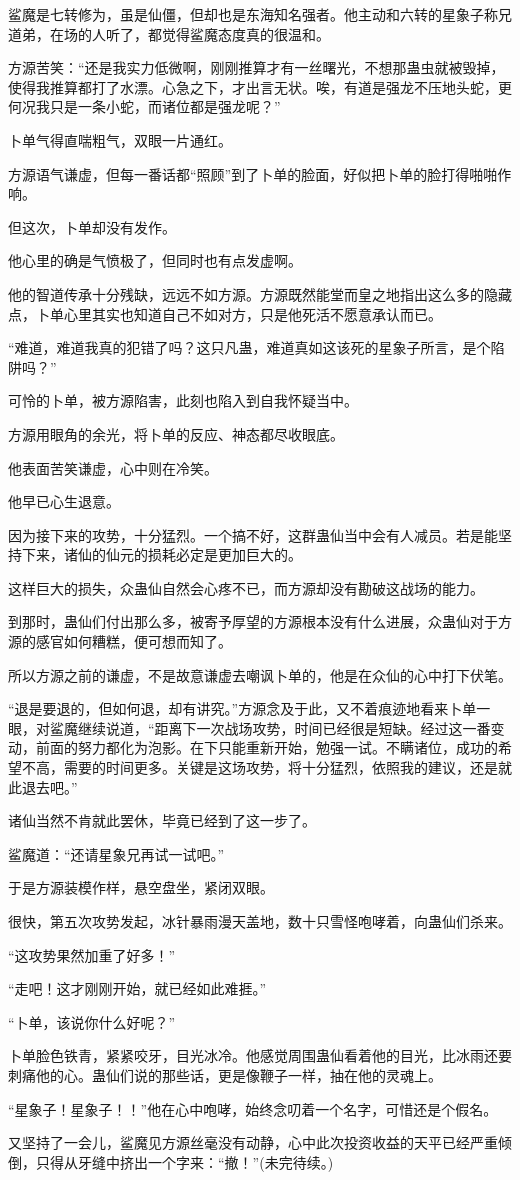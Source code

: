 \begin{this_body}
鲨魔是七转修为，虽是仙僵，但却也是东海知名强者。他主动和六转的星象子称兄道弟，在场的人听了，都觉得鲨魔态度真的很温和。

方源苦笑：“还是我实力低微啊，刚刚推算才有一丝曙光，不想那蛊虫就被毁掉，使得我推算都打了水漂。心急之下，才出言无状。唉，有道是强龙不压地头蛇，更何况我只是一条小蛇，而诸位都是强龙呢？”

卜单气得直喘粗气，双眼一片通红。

方源语气谦虚，但每一番话都“照顾”到了卜单的脸面，好似把卜单的脸打得啪啪作响。

但这次，卜单却没有发作。

他心里的确是气愤极了，但同时也有点发虚啊。

他的智道传承十分残缺，远远不如方源。方源既然能堂而皇之地指出这么多的隐藏点，卜单心里其实也知道自己不如对方，只是他死活不愿意承认而已。

“难道，难道我真的犯错了吗？这只凡蛊，难道真如这该死的星象子所言，是个陷阱吗？”

可怜的卜单，被方源陷害，此刻也陷入到自我怀疑当中。

方源用眼角的余光，将卜单的反应、神态都尽收眼底。

他表面苦笑谦虚，心中则在冷笑。

他早已心生退意。

因为接下来的攻势，十分猛烈。一个搞不好，这群蛊仙当中会有人减员。若是能坚持下来，诸仙的仙元的损耗必定是更加巨大的。

这样巨大的损失，众蛊仙自然会心疼不已，而方源却没有勘破这战场的能力。

到那时，蛊仙们付出那么多，被寄予厚望的方源根本没有什么进展，众蛊仙对于方源的感官如何糟糕，便可想而知了。

所以方源之前的谦虚，不是故意谦虚去嘲讽卜单的，他是在众仙的心中打下伏笔。

“退是要退的，但如何退，却有讲究。”方源念及于此，又不着痕迹地看来卜单一眼，对鲨魔继续说道，“距离下一次战场攻势，时间已经很是短缺。经过这一番变动，前面的努力都化为泡影。在下只能重新开始，勉强一试。不瞒诸位，成功的希望不高，需要的时间更多。关键是这场攻势，将十分猛烈，依照我的建议，还是就此退去吧。”

诸仙当然不肯就此罢休，毕竟已经到了这一步了。

鲨魔道：“还请星象兄再试一试吧。”

于是方源装模作样，悬空盘坐，紧闭双眼。

很快，第五次攻势发起，冰针暴雨漫天盖地，数十只雪怪咆哮着，向蛊仙们杀来。

“这攻势果然加重了好多！”

“走吧！这才刚刚开始，就已经如此难捱。”

“卜单，该说你什么好呢？”

卜单脸色铁青，紧紧咬牙，目光冰冷。他感觉周围蛊仙看着他的目光，比冰雨还要刺痛他的心。蛊仙们说的那些话，更是像鞭子一样，抽在他的灵魂上。

“星象子！星象子！！”他在心中咆哮，始终念叨着一个名字，可惜还是个假名。

又坚持了一会儿，鲨魔见方源丝毫没有动静，心中此次投资收益的天平已经严重倾倒，只得从牙缝中挤出一个字来：“撤！”(未完待续。)

\end{this_body}


